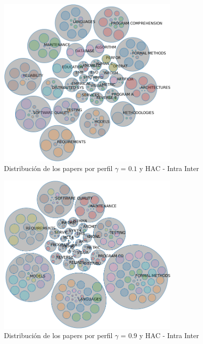 \begin{figure}[H]
  \centering
    \includegraphics[width=0.8\textwidth]{resultados/papers/HAC/INTRA_INTER/bubbles-gamma-01.png}
  \caption{Distribución de los papers por perfil $\gamma$ = $0.1$ y HAC - Intra Inter}
  \label{res:img-papers-bubbles-gamma01-hac-intra-inter}
\end{figure}

\begin{figure}[H]
  \centering
    \includegraphics[width=0.8\textwidth]{resultados/papers/HAC/INTRA_INTER/bubbles-gamma-09.png}
  \caption{Distribución de los papers por perfil $\gamma$ = $0.9$ y HAC - Intra Inter}
  \label{res:img-papers-bubbles-gamma09-hac-intra-inter}
\end{figure}

